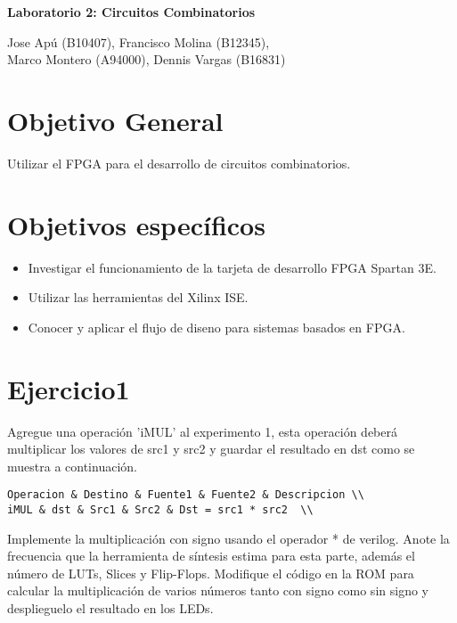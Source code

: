\documentclass[10pt]{article}
\begin{document}
\begin{huge}
\begin{center}
\textbf{Laboratorio 2: Circuitos Combinatorios}
\end{center}
\end{huge}

\begin{Large}
\begin{center}
Jose Apú (B10407), Francisco Molina (B12345), \\Marco Montero (A94000), Dennis Vargas (B16831)
\end{center}
\end{Large}


\section*{Objetivo General}
Utilizar el FPGA para el desarrollo de circuitos combinatorios.

\section*{Objetivos específicos}
\begin{itemize}
\item Investigar el funcionamiento de la tarjeta de desarrollo FPGA Spartan 3E.
\item Utilizar las herramientas del Xilinx ISE.
\item Conocer y aplicar el flujo de diseno para sistemas basados en FPGA.
\end{itemize}

\newpage

\section*{Ejercicio1}
 Agregue una operación 'iMUL' al experimento 1, esta operación deberá multiplicar los valores de src1 y src2 y guardar el resultado en dst como se muestra a continuación.
\begin{lstlisting}
Operacion & Destino & Fuente1 & Fuente2 & Descripcion \\
iMUL & dst & Src1 & Src2 & Dst = src1 * src2  \\
\end{lstlisting}

Implemente la multiplicación con signo usando el operador * de verilog. Anote la frecuencia que la herramienta de síntesis estima para esta parte, además el número de LUTs, Slices y Flip-Flops. Modifique el código en la ROM para calcular la multiplicación de varios números tanto con signo como sin signo y desplieguelo el resultado en los LEDs.
\end{document}

